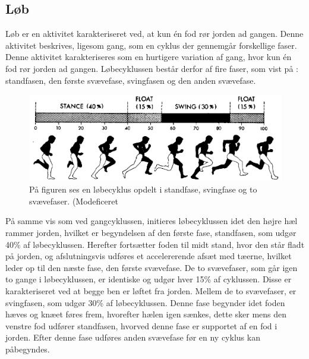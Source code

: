 \subsection{Løb}
Løb er en aktivitet karakteriseret ved, at kun én fod rør jorden ad gangen. Denne aktivitet beskrives, ligesom gang, som en cyklus der gennemgår forskellige faser. Denne aktivitet karakteriseres som en hurtigere variation af gang, hvor kun én fod rør jorden ad gangen. Løbecyklussen består derfor af fire faser, som vist på : standfasen, den første svævefase, svingfasen og den anden svævefase. \citep{Adelaar1986,Novacheck1998}

\begin{figure}[H]
	\centering
	\includegraphics[scale=0.4]{figures/bProblemloesning/loeb_cyklus1.png}
	\caption{På figuren ses en løbecyklus opdelt i standfase, svingfase og to svævefaser. \citep{Adelaar1986} (Modeficeret}
	\label{fig:loebecyklus}
\end{figure}

På samme vis som ved gangcyklussen, initieres løbecyklussen idet den højre hæl rammer jorden, hvilket er begyndelsen af den første fase, standfasen, som udgør 40\% af løbecyklussen. Herefter fortsætter foden til midt stand, hvor den står fladt på jorden, og afslutningsvis udføres et accelererende afsæt med tæerne, hvilket leder op til den næste fase, den første svævefase. \newline
De to svævefaser, som går igen to gange i løbecyklussen, er identiske og udgør hver 15\% af cyklussen. Disse er karakteriseret ved at begge ben er løftet fra jorden. \newline
Mellem de to svævefaser, er svingfasen, som udgør 30\% af løbecyklussen. Denne fase begynder idet foden hæves og knæet føres frem, hvorefter hælen igen sænkes, dette sker mens den venstre fod udfører standfasen, hvorved denne fase er supportet af en fod i jorden. Efter denne fase udføres anden svævefase før en ny cyklus kan påbegyndes. \citep{Adelaar1986,Novacheck1998}

